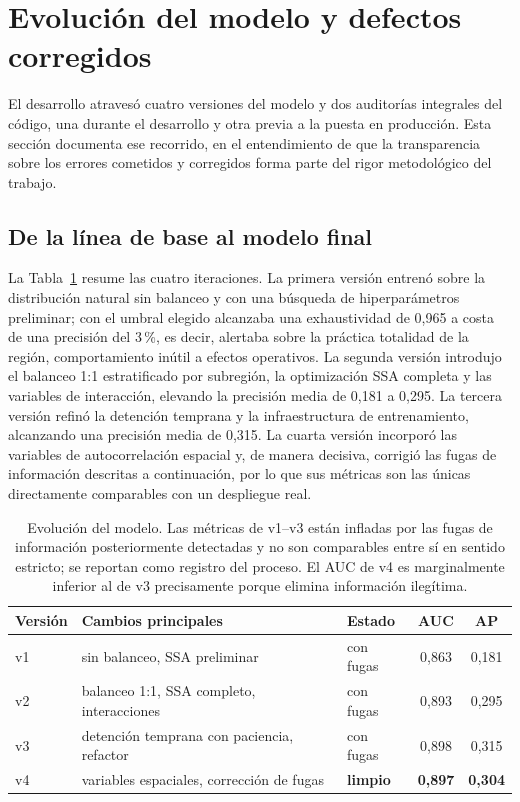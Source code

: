 \documentclass[11pt,a4paper]{article}
\begin{document}
\section{Evolución del modelo y defectos corregidos}
\label{sec:evolucion}

El desarrollo atravesó cuatro versiones del modelo y dos auditorías
integrales del código, una durante el desarrollo y otra previa a la puesta
en producción. Esta sección documenta ese recorrido, en el entendimiento de
que la transparencia sobre los errores cometidos y corregidos forma parte
del rigor metodológico del trabajo.

\subsection{De la línea de base al modelo final}
\label{sec:versiones}

La Tabla~\ref{tab:versiones} resume las cuatro iteraciones. La primera
versión entrenó sobre la distribución natural sin balanceo y con una
búsqueda de hiperparámetros preliminar; con el umbral elegido alcanzaba una
exhaustividad de 0,965 a costa de una precisión del 3\,\%, es decir,
alertaba sobre la práctica totalidad de la región, comportamiento inútil a
efectos operativos. La segunda versión introdujo el balanceo 1:1
estratificado por subregión, la optimización SSA completa y las variables
de interacción, elevando la precisión media de 0,181 a 0,295. La tercera
versión refinó la detención temprana y la infraestructura de entrenamiento,
alcanzando una precisión media de 0,315. La cuarta versión incorporó las
variables de autocorrelación espacial y, de manera decisiva, corrigió las
fugas de información descritas a continuación, por lo que sus métricas son
las únicas directamente comparables con un despliegue real.

\begin{table}[H]
\centering\small
\begin{tabular}{@{}lllcc@{}}
\toprule
\textbf{Versión} & \textbf{Cambios principales} & \textbf{Estado} & \textbf{AUC} & \textbf{AP} \\
\midrule
v1 & sin balanceo, SSA preliminar & con fugas & 0,863 & 0,181 \\
v2 & balanceo 1:1, SSA completo, interacciones & con fugas & 0,893 & 0,295 \\
v3 & detención temprana con paciencia, refactor & con fugas & 0,898 & 0,315 \\
v4 & variables espaciales, corrección de fugas & \textbf{limpio} & \textbf{0,897} & \textbf{0,304} \\
\bottomrule
\end{tabular}
\caption{Evolución del modelo. Las métricas de v1--v3 están infladas por las
fugas de información posteriormente detectadas y no son comparables entre
sí en sentido estricto; se reportan como registro del proceso. El AUC de v4
es marginalmente inferior al de v3 precisamente porque elimina información
ilegítima.}
\label{tab:versiones}
\end{table}
\end{document}

